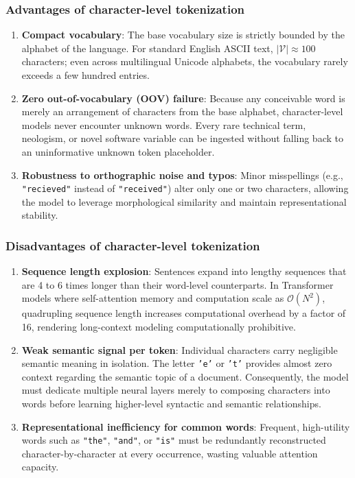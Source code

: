 \documentclass[../../main.tex]{subfiles}
\begin{document}
\subsubsection{Advantages of character-level tokenization}
\begin{enumerate}
    \item \textbf{Compact vocabulary}: The base vocabulary size is strictly bounded by the alphabet of the language. For standard English ASCII text, $|\mathcal{V}| \approx 100$ characters; even across multilingual Unicode alphabets, the vocabulary rarely exceeds a few hundred entries.
    \item \textbf{Zero out-of-vocabulary (OOV) failure}: Because any conceivable word is merely an arrangement of characters from the base alphabet, character-level models never encounter unknown words. Every rare technical term, neologism, or novel software variable can be ingested without falling back to an uninformative unknown token placeholder.
    \item \textbf{Robustness to orthographic noise and typos}: Minor misspellings (e.g., \texttt{"recieved"} instead of \texttt{"received"}) alter only one or two characters, allowing the model to leverage morphological similarity and maintain representational stability.
\end{enumerate}

\subsubsection{Disadvantages of character-level tokenization}
\begin{enumerate}
    \item \textbf{Sequence length explosion}: Sentences expand into lengthy sequences that are 4 to 6 times longer than their word-level counterparts. In Transformer models where self-attention memory and computation scale as $\mathcal{O}(N^2)$, quadrupling sequence length increases computational overhead by a factor of 16, rendering long-context modeling computationally prohibitive.
    \item \textbf{Weak semantic signal per token}: Individual characters carry negligible semantic meaning in isolation. The letter \texttt{'e'} or \texttt{'t'} provides almost zero context regarding the semantic topic of a document. Consequently, the model must dedicate multiple neural layers merely to composing characters into words before learning higher-level syntactic and semantic relationships.
    \item \textbf{Representational inefficiency for common words}: Frequent, high-utility words such as \texttt{"the"}, \texttt{"and"}, or \texttt{"is"} must be redundantly reconstructed character-by-character at every occurrence, wasting valuable attention capacity.
\end{enumerate}
\end{document}
